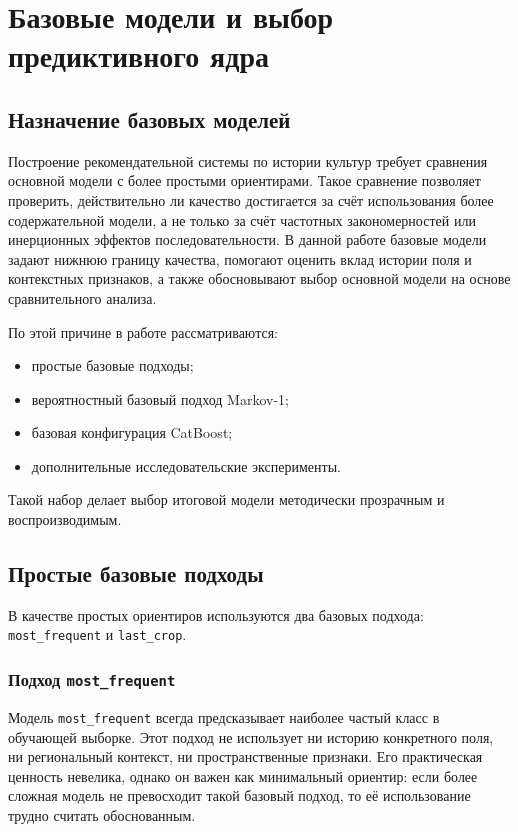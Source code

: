 \section{Базовые модели и выбор предиктивного ядра}

\subsection{Назначение базовых моделей}

Построение рекомендательной системы по истории культур требует сравнения основной модели с более простыми ориентирами.
Такое сравнение позволяет проверить, действительно ли качество достигается за счёт использования более содержательной
модели, а не только за счёт частотных закономерностей или инерционных эффектов последовательности. В данной работе
базовые модели задают нижнюю границу качества, помогают оценить вклад истории поля и контекстных признаков, а также
обосновывают выбор основной модели на основе сравнительного анализа.

По этой причине в работе рассматриваются:

\begin{itemize}
\tightlist
\item
  простые базовые подходы;
\item
  вероятностный базовый подход Markov-1;
\item
  базовая конфигурация CatBoost;
\item
  дополнительные исследовательские эксперименты.
\end{itemize}

Такой набор делает выбор итоговой модели методически прозрачным и воспроизводимым.

\subsection{Простые базовые подходы}

В качестве простых ориентиров используются два базовых подхода: \texttt{most\_frequent} и \texttt{last\_crop}.

\subsubsection{\texorpdfstring{Подход \texttt{most\_frequent}}{Подход most\_frequent}}

Модель \texttt{most\_frequent} всегда предсказывает наиболее частый класс в обучающей выборке. Этот подход не
использует ни историю конкретного поля, ни региональный контекст, ни пространственные признаки. Его практическая
ценность невелика, однако он важен как минимальный ориентир: если более сложная модель не превосходит такой базовый
подход, то её использование трудно считать обоснованным.


